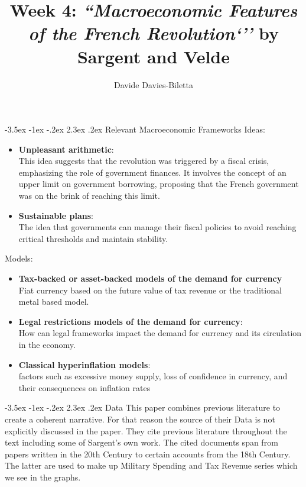 \documentclass[]{article}
\title{Week 4: \textit{``Macroeconomic Features of the French
		Revolution`''} by Sargent and Velde}
\author{Davide Davies-Biletta}
\makeatletter
\newcommand{\bb}{\bigbreak\noindent}
\renewcommand\section{\leftskip 0pt\@startsection {section}{1}{\z@}%
	{-3.5ex \@plus -1ex \@minus -.2ex}%
	{2.3ex \@plus.2ex}%
	{\normalfont\Large\bfseries}}
\makeatother
\begin{document}
\maketitle

\section{Relevant Macroeconomic Frameworks}
Ideas: 
\begin{itemize}
	\item \textbf{Unpleasant arithmetic}:\\
		    This idea suggests that the revolution was triggered by a fiscal crisis, emphasizing the role of government finances. It involves the concept of an upper limit on government borrowing, proposing that the French government was on the brink of reaching this limit.
	\item \textbf{Sustainable plans}:\\
		The idea that governments can manage their fiscal policies to avoid reaching critical thresholds and maintain stability.
	\end{itemize}
\bb
Models:
\begin{itemize}
	\item \textbf{Tax-backed or asset-backed models of the demand for currency}\\
			Fiat currency based on the future value of tax revenue or the traditional metal based model.
			
	\item \textbf{Legal restrictions models of the demand for currency}:\\
		How can legal frameworks impact the demand for currency and its circulation in the economy.
	
	\item \textbf{Classical hyperinflation models}:\\
		  factors such as excessive money supply, loss of confidence in currency, and their consequences on inflation rates
	
	
	
\end{itemize}


\section{Data}
This paper combines previous literature to create a coherent narrative. For that reason the source of their Data is not explicitly discussed in the paper. They cite previous literature throughout the text including some of Sargent's own work. The cited documents span from papers written in the 20th Century to certain accounts from the 18th Century. The latter are used to make up Military Spending and Tax Revenue series which we see in the graphs. 
\end{document}
